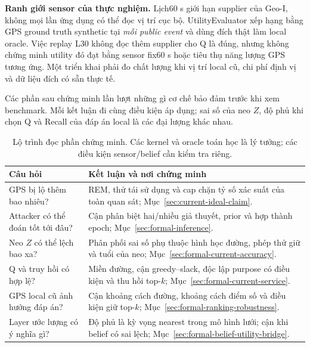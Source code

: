 \textbf{Ranh giới sensor của thực nghiệm.} Lịch60 s giới hạn supplier của Geo-I, không mọi lần ứng dụng có thể đọc vị trí cục bộ. UtilityEvaluator xếp hạng bằng GPS ground truth synthetic tại \emph{mỗi public event} và dùng đích thật làm local oracle. Việc replay L30 không đọc thêm supplier cho Q là đúng, nhưng không chứng minh utility đó đạt bằng sensor fix60 s hoặc tiêu thụ năng lượng GPS tương ứng. Một triển khai phải đo chất lượng khi vị trí local cũ, chi phí định vị và dữ liệu đích có sẵn thực tế.



Các phần sau chứng minh lần lượt những gì cơ chế bảo đảm trước khi xem
benchmark. Mỗi kết luận đi cùng điều kiện áp dụng; sai số của neo $Z$,
độ phủ khi chọn Q và Recall của đáp án local là các đại lượng khác nhau.
\begin{table}[htbp]\centering\small
\caption{Lộ trình đọc phần chứng minh. Các kernel và oracle toán học là lý tưởng; các điều kiện sensor/belief cần kiểm tra riêng.}
\begin{tabularx}{\textwidth}{P{3.2cm}Y}\toprule
Câu hỏi & Kết luận và nơi chứng minh\\\midrule
GPS bị lộ thêm bao nhiêu? & REM, thử tái sử dụng và cap chặn tỷ số xác suất của toàn quan sát; Mục~\ref{sec:current-ideal-claim}.\\
Attacker có thể đoán tốt tới đâu? & Cận phân biệt hai/nhiều giả thuyết, prior và hợp thành epoch; Mục~\ref{sec:formal-inference}.\\
Neo $Z$ có thể lệch bao xa? & Phân phối sai số phụ thuộc hình học đường, phép thử giữ và tuổi của neo; Mục~\ref{sec:formal-current-accuracy}.\\
Q và truy hồi có hợp lệ? & Miền đường, cận greedy--slack, độc lập purpose có điều kiện và thu hồi top-$k$; Mục~\ref{sec:formal-current-service}.\\
GPS local cũ ảnh hưởng đáp án? & Cận khoảng cách đường, khoảng cách điểm số và điều kiện giữ top-$k$; Mục~\ref{sec:formal-ranking-robustness}.\\
Layer ước lượng có ý nghĩa gì? & Độ phủ là kỳ vọng nearest trong mô hình lưới; cận khi belief có sai lệch; Mục~\ref{sec:formal-belief-utility-bridge}.\\\bottomrule
\end{tabularx}
\end{table}








